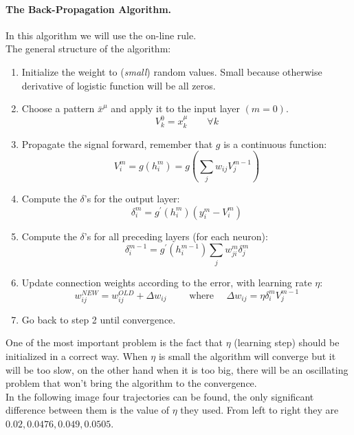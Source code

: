 \paragraph*{The Back-Propagation Algorithm.} In this algorithm we will use the on-line rule.\\
The general structure of the algorithm:
\begin{enumerate}
	\item Initialize the weight to (\textit{small}) random values. Small because otherwise derivative of logistic function will be all zeros.
	\item Choose a pattern $\bar{x}^\mu$ and apply it to the input layer $(m=0)$.
	$$V _ { k } ^ { 0 } = x _ { k } ^ { \mu } \qquad \forall k$$
	\item Propagate the signal forward, remember that $g$ is a continuous function:
	$$V _ {i} ^ { m } = g \left( h _ { i } ^ { m } \right) = g \left( \sum _ { j } w _ { i j } V _ { j } ^ { m - 1 } \right)$$
	\item Compute the $\delta$'s for the output layer:
	$$\delta _ { i } ^ { m } = g ^ { \prime } \left( h _ { i } ^ { m } \right) \left( y _ { i } ^ { m } - V _ { i } ^ { m } \right)$$
	\item Compute the $\delta$'s for all preceding layers (for each neuron):
	$$\delta _ { i } ^ { m - 1 } = g ^ { \prime } \left( h _ { i } ^ { m - 1 } \right) \sum _ { j } w _ { j i } ^ { m } \delta _ { j } ^ { m }$$
	\item Update connection weights according to the error, with learning rate $\eta$:
	$$w _ { i j } ^ { N E W } = w _ { i j } ^ { O L D } + \Delta w _ { i j } \qquad \text { where } \quad \Delta w _ { i j } = \eta \delta _ { i } ^ { m } V _ { j } ^ { m - 1 }$$
	\item Go back to step 2 until convergence.
\end{enumerate}
One of the most important problem is the fact that $\eta$ (learning step) should be initialized in a correct way. When $\eta$ is small the algorithm will converge but it will be too slow, on the other hand when it is too big, there will be an oscillating problem that won't bring the algorithm to the convergence. \\
In the following image four trajectories can be found, the only significant difference between them is the value of $\eta$ they used. From left to right they are $0.02, 0.0476, 0.049, 0.0505$.

